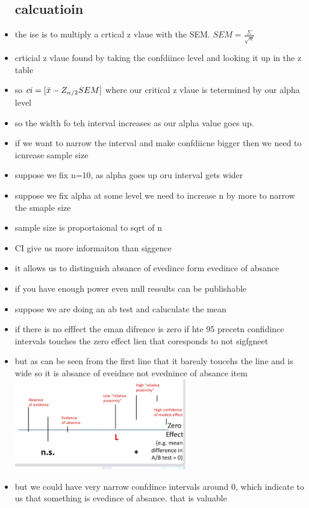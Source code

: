 \documentclass{article}
\begin{document}
\begin{itemize}
\subsection{calcuatioin }
\item the ise is to multiply a crtical z vlaue with the SEM. $SEM=\frac{\Sigma}{\sqrt{n}}$
\item crticial z vlaue found by taking the confdiince level and looking it up in the z table
\item so $ci=[\Bar{x}-Z_{\alpha/2}SEM]$ where our critical z vlaue is tetermined by our alpha level 
\item so the width fo teh interval increases as our alpha value goes up.
\item if we want to narrow the interval and make confdiicne bigger then we need to icnrease sample size 
\item suppose we fix n=10, as alpha goes up oru interval gets wider
\item suppose we fix alpha at some level we need to increase n  by more to narrow the smaple size
\item sample size is proportaional to sqrt of n 
\item CI give us more informaiton than siggence 
\item it allows us to distinguish absance of evedince form evedince of absance 
\item if you have enough power even null ressults can be publishable 
\item suppose we are doing an ab test and caluculate the mean
\item if there is no efffect the eman difrence is zero
\itme if hte 95 precetn confidince intervals touches the zero effect lien that coresponds to not sigfgneet 
\item but as can be seen from the first line that it barealy toucehs the line and is wide so it is absance of eveidnce not evednince of absance 
item \includegraphics[width=7.5cm]{Final_Review/lecture_5/ci bounds example.jpg}
\item but we could have very narrow confdince intervals around 0, which indicate to us that something is evedince of absance. that is valuable 

\end{itemize}
\end{document}
